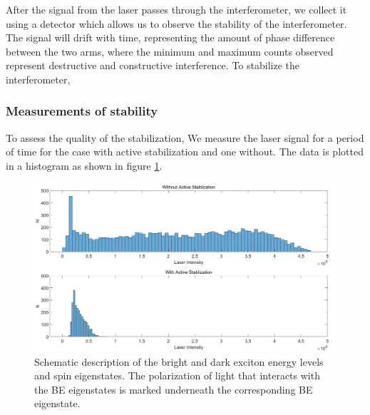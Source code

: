  After the signal from the laser passes through the interferometer, we collect it using a detector which allows us to observe the stability of the interferometer. The signal will drift with time, representing the  amount of phase difference between the two arms, where the minimum and maximum counts observed represent destructive and constructive interference. To stabilize the interferometer, 

\subsubsection{Measurements of stability}
To assess the quality of the stabilization, We measure the laser signal for a period of time for the case with active stabilization and one without. The data is plotted in a histogram as shown in figure \ref{fig:stablization_histogram}.
\begin{figure}[H]
	\centering
	\includegraphics[scale=0.32]{figures/StablizationHistogram.jpg}
	\caption{Schematic description of the bright and dark exciton energy levels and spin eigenstates. The polarization of light that interacts with the BE eigenstates is marked underneath the corresponding BE eigenstate.}
	\label{fig:stablization_histogram}
\end{figure}
